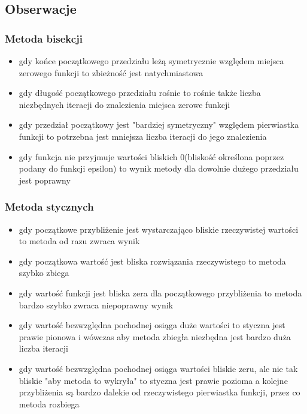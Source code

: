 \documentclass{article}
\begin{document}
\subsection{Obserwacje}
\subsubsection{Metoda bisekcji}
\begin{itemize}
    \item gdy końce początkowego przedziału leżą symetrycznie względem miejsca zerowego funkcji to zbieżność jest natychmiastowa
    \item gdy długość początkowego przedziału rośnie to rośnie także liczba niezbędnych iteracji do znalezienia miejsca zerowe funkcji
    \item gdy przedział początkowy jest "bardziej symetryczny" względem pierwiastka funkcji to potrzebna jest mniejsza liczba iteracji do jego znalezienia
    \item gdy funkcja nie przyjmuje wartości bliskich $0$(bliskość określona poprzez podany do funkcji epsilon) to wynik metody dla dowolnie dużego przedziału jest poprawny
\end{itemize}

\subsubsection{Metoda stycznych}
\begin{itemize}
    \item gdy początkowe przybliżenie jest wystarczająco bliskie rzeczywistej wartości to metoda od razu zwraca wynik
    \item gdy początkowa wartość jest bliska rozwiązania rzeczywistego to metoda szybko zbiega
    \item gdy wartość funkcji jest bliska zera dla początkowego przybliżenia to metoda bardzo szybko zwraca niepoprawny wynik
    \item gdy wartość bezwzględna pochodnej osiąga duże wartości to styczna jest prawie pionowa i wówczas aby metoda zbiegła niezbędna jest bardzo duża liczba iteracji
    \item gdy wartość bezwzględna pochodnej osiąga wartości bliskie zeru, ale nie tak bliskie "aby metoda to wykryła" to styczna jest prawie pozioma a kolejne przybliżenia są bardzo dalekie od rzeczywistego pierwiastka funkcji, przez co metoda rozbiega
\end{itemize}

\newpage
\end{document}
